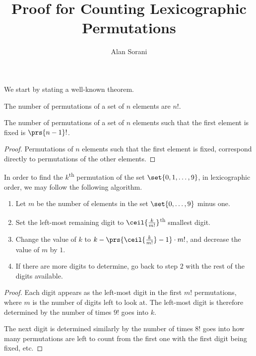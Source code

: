 \documentclass[10pt]{article}
\author{Alan Sorani}
\title{Proof for Counting Lexicographic Permutations}
\begin{document}
\maketitle

We start by stating a well-known theorem.

\begin{theorem}
The number of permutations of a set of $n$ elements are $n!$.
\end{theorem}

\begin{corollary}
The number of permutations of a set of $n$ elements such that the first element is fixed is $\prs{n-1}!$.
\end{corollary}

\begin{proof}
Permutations of $n$ elements such that the first element is fixed, correspond directly to permutations of the other elements.
\end{proof}

\begin{corollary}
In order to find the $k$\textsuperscript{th} permutation of the set $\set{0, 1, \ldots, 9}$, in lexicographic order, we may follow the following algorithm.

\begin{enumerate}
\item Let $m$ be the number of elements in the set $\set{0, \ldots, 9}$ minus one.
\item Set the left-most remaining digit to $\ceil{\frac{k}{m!}}$\textsuperscript{th} smallest digit.
\item Change the value of $k$ to $k - \prs{\ceil{\frac{k}{m!}} - 1} \cdot m!$, and decrease the value of $m$ by $1$.
\item If there are more digits to determine, go back to step $2$ with the rest of the digits available.
\end{enumerate}
\end{corollary}

\begin{proof}
Each digit appears as the left-most digit in the first $m!$ permutations, where $m$ is the number of digits left to look at.
The left-most digit is therefore determined by the number of times $9!$ goes into $k$.

The next digit is determined similarly by the number of times $8!$ goes into how many permutations are left to count from the first one with the first digit being fixed, etc.
\end{proof}



\printbibliography
\end{document}
